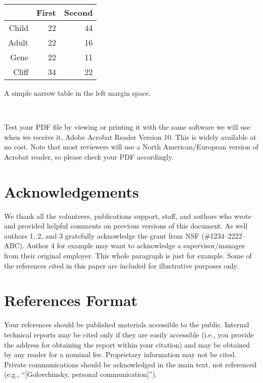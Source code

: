 \documentclass{sigchi-ext}
\begin{document}
    \begin{margintable}[1pc]
      \begin{minipage}{\marginparwidth}
        \centering
        \begin{tabular}{r r r}
          & {\small \textbf{First}}
          & {\small \textbf{Second}} \\
          \toprule
          Child & 22 & 44 \\
          Adult & 22 & 16 \\
          \midrule
          Gene & 22 & 11 \\
          Cliff & 34 & 22 \\
          \bottomrule
        \end{tabular}
        \caption{A simple narrow table in the left margin
          space.}~\label{tab:table2}
      \end{minipage}
    \end{margintable}
    Test your PDF file by viewing or printing it with the same software we
    will use when we receive it, Adobe Acrobat Reader Version 10. This is
    widely available at no cost. Note that most
    reviewers will use a North American/European version of Acrobat
    reader, so please check your PDF accordingly.
    
    \section{Acknowledgements}
    We thank all the volunteers, publications support, staff, and authors
    who wrote and provided helpful comments on previous versions of this
    document. As well authors 1, 2, and 3 gratefully acknowledge the grant
    from NSF (\#1234--2222--ABC). Author 4 for example may want to
    acknowledge a supervisor/manager from their original employer. This
    whole paragraph is just for example. Some of the references cited in
    this paper are included for illustrative purposes only.
    
    \section{References Format}
    Your references should be published materials accessible to the
    public. Internal technical reports may be cited only if they are
    easily accessible (i.e., you provide the address for obtaining the
    report within your citation) and may be obtained by any reader for a
    nominal fee. Proprietary information may not be cited. Private
    communications should be acknowledged in the main text, not referenced
    (e.g., ``[Golovchinsky, personal communication]'').
    
\end{document}
